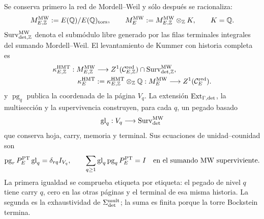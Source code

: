 Se conserva primero la red de Mordell--Weil y sólo después se racionaliza:
\begin{equation}\label{eq:pdf2-bsd-mw-libre}
 M_{E,\mathbb Z}^{\rm MW}:=E(\mathbb Q)/E(\mathbb Q)_{\rm tors},
 \qquad
 M_E^{\rm MW}:=M_{E,\mathbb Z}^{\rm MW}\otimes_{\mathbb Z}K,
 \qquad K=\mathbb Q.
\end{equation}
$\operatorname{Surv}_{{\rm det},\mathbb Z}^{\rm MW}$ denota el submódulo
libre generado por las filas terminales integrales del sumando
Mordell--Weil.
El levantamiento de Kummer con historia completa es
\begin{equation}\label{eq:pdf2-bsd-kummer-hmt}
 \begin{aligned}
 \kappa_{E,\mathbb Z}^{\rm HMT}:M_{E,\mathbb Z}^{\rm MW}
   &\longrightarrow
   Z^1(\mathcal C_{E,\mathbb Z}^{\rm red})
   \cap\operatorname{Surv}_{{\rm det},\mathbb Z}^{\rm MW},\\
 \kappa_E^{\rm HMT}&:=
   \kappa_{E,\mathbb Z}^{\rm HMT}\otimes_{\mathbb Z}\mathbb Q:
   M_E^{\rm MW}\longrightarrow Z^1(\mathcal C_E^{\rm red}).
 \end{aligned}
\end{equation}
y $\operatorname{pg}_q$ publica la coordenada de la página $V_q$. La
extensión $\operatorname{Ext}_{\Gamma,{\rm det}}$, la multisección y la
supervivencia construyen, para cada $q$, un pegado basado
\begin{equation}\label{eq:pdf2-bsd-glue-q}
 \operatorname{gl}_q:V_q\longrightarrow
 \operatorname{Surv}_{\rm det}^{\rm MW}
\end{equation}
que conserva hoja, carry, memoria y terminal. Sus ecuaciones de
unidad--counidad son
\begin{equation}\label{eq:pdf2-bsd-unidad-counidad-paginas}
 \operatorname{pg}_rP_E^{\rm PT}\operatorname{gl}_q
 =\delta_{rq}I_{V_q},
 \qquad
 \sum_{q\ge1}\operatorname{gl}_q
     \operatorname{pg}_qP_E^{\rm PT}=I
 \quad\text{en el sumando MW superviviente}.
\end{equation}
La primera igualdad se comprueba etiqueta por etiqueta: el pegado de nivel
$q$ tiene carry $q$, cero en las otras páginas y el terminal de esa misma
historia. La segunda es la exhaustividad de
$\Sigma_{\rm det}^{\rm mult}$; la suma es finita porque la torre Bockstein
termina.

